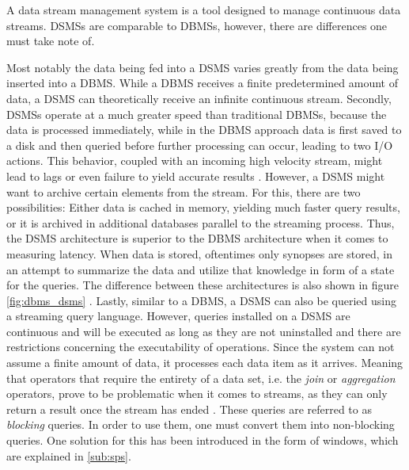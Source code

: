         A data stream management system is a tool designed to manage continuous data streams.
        DSMSs are comparable to DBMSs, however, there are differences one must take note of.

        \quad Most notably the data being fed into a DSMS varies greatly from the data being inserted into a DBMS. While a DBMS receives a finite predetermined amount 
        of data, a DSMS can theoretically receive an infinite continuous stream.
        Secondly, DSMSs operate at a much greater speed than traditional DBMSs, because the data is processed immediately, while in the DBMS approach
        data is first saved to a disk and then queried before further processing can occur, leading to two I/O actions. This behavior, coupled with an incoming 
        high velocity stream, might lead to lags or even failure to yield accurate results \cite{StreamBookQuality}. 
        However, a DSMS might want to archive certain elements from the stream. For this, there are two possibilities:
        Either data is cached in memory, yielding much faster query results, or it is archived in additional databases parallel to the streaming process.
        Thus, the DSMS architecture is superior to the DBMS architecture when it comes to measuring latency.
        When data is stored, oftentimes only synopses are stored, in an attempt to summarize the data and utilize that knowledge in form of a \gls{state} for the queries.
        The difference between these architectures is also shown in figure \ref{fig:dbms_dsms} \cite{StreamBookQuality}.
        Lastly, similar to a DBMS, a DSMS can also be queried using a streaming query language. However, queries installed on a DSMS are continuous 
        and will be executed as long as they are not uninstalled and there are restrictions concerning the executability of operations.
        Since the system can not assume a finite amount of data, it processes each data item as it arrives. Meaning that operators that require the entirety of a data 
        set, i.e. the \textit{join} or \textit{aggregation} operators, prove to be problematic when it comes to streams, 
        as they can only return a result once the stream has ended \cite[p.12]{StreamBookQuality}.
        These queries are referred to as \textit{blocking} queries. In order to use them, one must convert them into non-blocking queries.
        One solution for this has been introduced in the form of windows, which are explained in \ref{sub:sps}.

